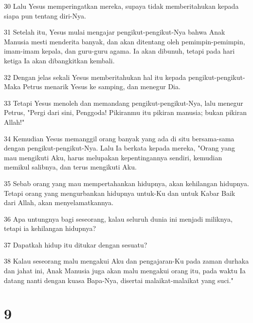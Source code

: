 \par 30 Lalu Yesus memperingatkan mereka, supaya tidak memberitahukan kepada siapa pun tentang diri-Nya.
\par 31 Setelah itu, Yesus mulai mengajar pengikut-pengikut-Nya bahwa Anak Manusia mesti menderita banyak, dan akan ditentang oleh pemimpin-pemimpin, imam-imam kepala, dan guru-guru agama. Ia akan dibunuh, tetapi pada hari ketiga Ia akan dibangkitkan kembali.
\par 32 Dengan jelas sekali Yesus memberitahukan hal itu kepada pengikut-pengikut-Maka Petrus menarik Yesus ke samping, dan menegur Dia.
\par 33 Tetapi Yesus menoleh dan memandang pengikut-pengikut-Nya, lalu menegur Petrus, "Pergi dari sini, Penggoda! Pikiranmu itu pikiran manusia; bukan pikiran Allah!"
\par 34 Kemudian Yesus memanggil orang banyak yang ada di situ bersama-sama dengan pengikut-pengikut-Nya. Lalu Ia berkata kepada mereka, "Orang yang mau mengikuti Aku, harus melupakan kepentingannya sendiri, kemudian memikul salibnya, dan terus mengikuti Aku.
\par 35 Sebab orang yang mau mempertahankan hidupnya, akan kehilangan hidupnya. Tetapi orang yang mengurbankan hidupnya untuk-Ku dan untuk Kabar Baik dari Allah, akan menyelamatkannya.
\par 36 Apa untungnya bagi seseorang, kalau seluruh dunia ini menjadi miliknya, tetapi ia kehilangan hidupnya?
\par 37 Dapatkah hidup itu ditukar dengan sesuatu?
\par 38 Kalau seseorang malu mengakui Aku dan pengajaran-Ku pada zaman durhaka dan jahat ini, Anak Manusia juga akan malu mengakui orang itu, pada waktu Ia datang nanti dengan kuasa Bapa-Nya, disertai malaikat-malaikat yang suci."

\chapter{9}

